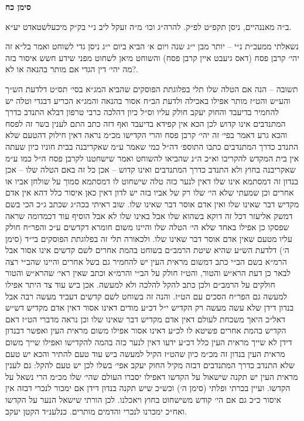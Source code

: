 \documentclass[12pt, openany]{book}
\newcommand{\chapname}{}
\newcommand{\newchap}[1]{
	\addcontentsline{toc}{chapter}{#1}
	\renewcommand{\chapname}{#1}
		\begin{center}
			\textbf{%
\fontsize{16pt}{16pt}\selectfont
				#1}
		\end{center}
}
\begin{document}
\newchap{סימן כח}
\begin{multicols}{2}
ב״ה מאננהיים, ניסן תקפ״ט לפ״ק. להרה״ג וכו׳ מ״ה זעקל ליב נ״י בק״ק מיכעלשטאדט יע״א.\\\vspace{0pt}

נשאלתי ממעכ״ת נ״י – יותר מבן י״ג שנה ויום א׳ הביא ביום י״ג ניסן גדי לשוחט ואמר בל״א זה יהי׳ קרבן פסח (דאס גיעבט איין קרבן פסח) והשוחט מיאן לשחוט מפני שידע חשש איסור בזה מה יהי׳ דין הגדי אם מותר בהנאה או לא?.\\\vspace{0pt}

תשובה – הנה אם הטלה שלו תלי בפלוגתת הפוסקים שהביא המג״א בסי׳ תס״ט דלדעת הש״ך והע״ש והט״ז מותר אפילו באכילה ולדעת הב״ח אסור בהנאה והמג״א הכריע דבגדי וטלה יש להחמיר בדיעבד והחוק יעקב חולק עליו וס״ל כיון דהלכה כרבי טרפון דבלא התנדב כדרך המתנדבים אינו קדוש לכן הכא אין קפידא בדיעבד ואף דזה כתב התם לענין בשר זה לפסח והכא גרע דאמר בפי׳ זה יהי׳ קרבן פסח והרי הקדישו מכ״מ נראה דאין חילוק דהטעם שלא התנדב כדרך המתנדבים כתבו התוספ׳ דה״ל כמי שאמר ע״מ שאקריבנה בבית חוניו כיון שעתה אין בית המקדש להקריבו וא״כ ה״נ שהביאו להשוחט ואמר שישחטנו לקרבן פסח ה״ל כמו ע״מ שאקריבנה בחוץ ולא התנדב כדרך המתנדבים ואינו קדוש – אכן כל זה באם הטלה שלו – אכן בנדון זה דמסתמא אינו שלו דאין לנער כזה טלה שישחוט לו דמסתמא סמוך על שולחן אביו או אחרים וכן שמעתי שלא הי׳ שלו רק של אביו בזה יש לדון דאין כאן איסור כלל דהא אין אדם מקדיש דבר שאינו שלו ואין אדם אוסר דבר שאינו שלו. שוב ראיתי בכה״ג שכתב ג״כ הכי בשם דמשק אליעזר דכל זה דוקא בשהוא שלו אבל באינו שלו לא אבל הוסיף עוד דכמדומה שראה שפסקו כן אפילו באחד שלא הי׳ הטלה שלו והיינו משום חומרא דקדשים ע״כ והפר״ח חולק עליו מטעם שאין אדם אוסר דבר שאינו שלו. ולכאורה תלי זה בפלוגתת הפוסקים בי״ד (סימן ה׳) דלדעת הש״ע שהיא שיטת הרמב״ם בשוחט בהמת אחרים לשם קדשים אינו אסור אבל הרמ״א בשם הב״י כתב דמשום מראית העין יש להחמיר גם בשל אחרים והיינו שהב״י רצה לבאר כן דעת הרא״ש והטור, והט״ז חולק על הב״י והרמ״א וכתב שאין ראי׳ שהרא״ש והטור חולקים על הרמב״ם ולכן כתב להקל להלכה ולא למעשה. אכן ביש עוד צד היתר אפילו למעשה גם הפר״ח הסכים עם הט״ז. והנה זה בשוחט לשם קדשים דעביד מעשה רבה אבל בנדון דידן שלא עשה מעשה רק הקדיש י״ל דכ״ע מודים דאינו אסור דאין אדם מקדיש דש״ש דאל״כ היאך משכחת לעולם דאין אדם מקדיש דבר שאינו שלו וכן נראה מדברי הט״ז דאם הקדיש בהמת אחרים פשיטא לו לכ״ע דאינו אסור אפילו משום מראית העין ואפשר דבנדון דידן לא שייך מראית העין כלל דכ״ע ידעו דאין לנער כזה בהמה להקדישו ואפילו שייך משום מראית העין בנדון זה מכ״מ כיון שהט״ז הקיל למעשה ביש עוד טעם להתיר והכא יש טעם שלא התנדב כדרך המתנדבים דבזה מקיל החוק יעקב אפי׳ בשלו לכן יש טעם להקל: גם לענין מראית העין יש תקנה שישאול על הקדשו דאפילו יסברו העולם שהי׳ שלו מכ״מ הרי נשאל על הקדשו. ועיין בכרתי ופלתי (סימן ה׳) וכש״כ שיש תקנה בנדון דידן אם ימכור לנכרי דבזה אין איסור כ״כ גם אם הי׳ קודש משישחוט בחוץ ויאכלנו. לכן הורתי שישאל הנער על הקדשו ואח״כ ימכרנו לנכרי והדמים מותרים. כנלענ״ד הקטן יעקב.\\\vspace{0pt}

\end{multicols}\newpage
\end{document}
